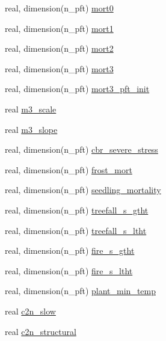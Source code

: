 \begin{DoxyCompactItemize}
\item 
real, dimension(n\+\_\+pft) \hyperlink{namespacepft__coms_a70607e766522bb0ddd5329aa60d6b5e7}{mort0}
\item 
real, dimension(n\+\_\+pft) \hyperlink{namespacepft__coms_a8a99e260a7d72b81ec6887289e4e8172}{mort1}
\item 
real, dimension(n\+\_\+pft) \hyperlink{namespacepft__coms_a869ad0792b73ae5285eeab0a57534f34}{mort2}
\item 
real, dimension(n\+\_\+pft) \hyperlink{namespacepft__coms_a20a7ffd42484a2150383fd540cd97641}{mort3}
\item 
real, dimension(n\+\_\+pft) \hyperlink{namespacepft__coms_a1a1f98514e1c80f9ab10a76eacb4f7eb}{mort3\+\_\+pft\+\_\+init}
\item 
real \hyperlink{namespacepft__coms_ad41cac7d6fa0b8d962cf3acd1d4b1587}{m3\+\_\+scale}
\item 
real \hyperlink{namespacepft__coms_a27553d075979c77be9aceaf78a289109}{m3\+\_\+slope}
\item 
real, dimension(n\+\_\+pft) \hyperlink{namespacepft__coms_aefc2c80125aa55f81fae3724cb4d5339}{cbr\+\_\+severe\+\_\+stress}
\item 
real, dimension(n\+\_\+pft) \hyperlink{namespacepft__coms_a744036814ca3b450807de9613e918153}{frost\+\_\+mort}
\item 
real, dimension(n\+\_\+pft) \hyperlink{namespacepft__coms_a0fe258b3674104f09d7226f87f39fc0b}{seedling\+\_\+mortality}
\item 
real, dimension(n\+\_\+pft) \hyperlink{namespacepft__coms_a0dde76d7d9a1502fb5b2095ac6ea30fb}{treefall\+\_\+s\+\_\+gtht}
\item 
real, dimension(n\+\_\+pft) \hyperlink{namespacepft__coms_af905b11e7eb1e1a30875d6b583839e92}{treefall\+\_\+s\+\_\+ltht}
\item 
real, dimension(n\+\_\+pft) \hyperlink{namespacepft__coms_a41960519e8244a038e84c2fe44b9a752}{fire\+\_\+s\+\_\+gtht}
\item 
real, dimension(n\+\_\+pft) \hyperlink{namespacepft__coms_ac154348fc689309b47112ac66a6df99d}{fire\+\_\+s\+\_\+ltht}
\item 
real, dimension(n\+\_\+pft) \hyperlink{namespacepft__coms_ae13d0f409c782cf00abbc9f09f55a5a8}{plant\+\_\+min\+\_\+temp}
\item 
real \hyperlink{namespacepft__coms_a4cd2632f30c0c38883e4191eb65e352b}{c2n\+\_\+slow}
\item 
real \hyperlink{namespacepft__coms_a8ff9ca7160d6ae9774adc3a314d8accd}{c2n\+\_\+structural}

\end{DoxyCompactItemize}
